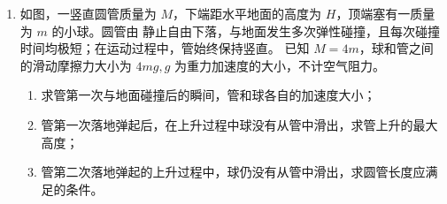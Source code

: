 \begin{enumerate}
\begin{enumerate}
\end{enumerate}
\begin{figure}[h!]
\flushright

\end{figure}





\newpage
\item
如图，一竖直圆管质量为 $ M $，下端距水平地面的高度为 $ H $，顶端塞有一质量为 $ m $ 的小球。圆管由
静止自由下落，与地面发生多次弹性碰撞，且每次碰撞时间均极短；在运动过程中，管始终保持竖直。
已知 $ M=4m $，球和管之间的滑动摩擦力大小为 $ 4mg,g $ 为重力加速度的大小，不计空气阻力。
\begin{enumerate}
\item
求管第一次与地面碰撞后的瞬间，管和球各自的加速度大小；
\item 
管第一次落地弹起后，在上升过程中球没有从管中滑出，求管上升的最大高度；
\item 
管第二次落地弹起的上升过程中，球仍没有从管中滑出，求圆管长度应满足的条件。

\end{enumerate}
\begin{figure}[h!]
\flushright

\end{figure}




\newpage


\end{enumerate}
